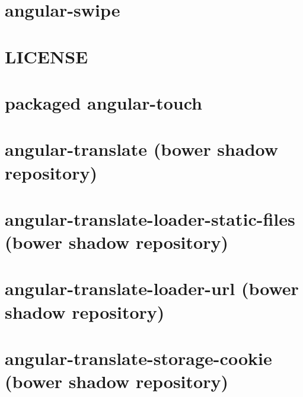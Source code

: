 \documentclass[twoside]{book}
\newcommand{\+}{\discretionary{\mbox{\scriptsize$\hookleftarrow$}}{}{}}
\begin{document}
\chapter{angular-\/swipe}
\label{md_app_web_bower_components_angular-swipe__r_e_a_d_m_e}

\chapter{L\+I\+C\+E\+N\+SE}
\label{md_app_web_bower_components_angular-touch__l_i_c_e_n_s_e}

\chapter{packaged angular-\/touch}
\label{md_app_web_bower_components_angular-touch__r_e_a_d_m_e}

\chapter{angular-\/translate (bower shadow repository)}
\label{md_app_web_bower_components_angular-translate__r_e_a_d_m_e}

\chapter{angular-\/translate-\/loader-\/static-\/files (bower shadow repository)}
\label{md_app_web_bower_components_angular-translate-loader-static-files__r_e_a_d_m_e}

\chapter{angular-\/translate-\/loader-\/url (bower shadow repository)}
\label{md_app_web_bower_components_angular-translate-loader-url__r_e_a_d_m_e}

\chapter{angular-\/translate-\/storage-\/cookie (bower shadow repository)}
\label{md_app_web_bower_components_angular-translate-storage-cookie__r_e_a_d_m_e}

\end{document}
